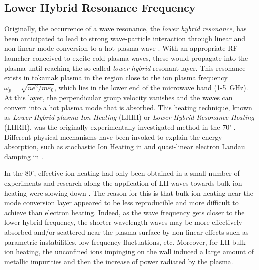 \subsection{Lower Hybrid Resonance Frequency}
Originally, the occurrence of a wave resonance, the \emph{lower hybrid resonance}, has been anticipated to lead to strong wave-particle interaction through linear and non-linear mode conversion to a hot plasma wave . With an appropriate RF launcher conceived to excite cold plasma waves, these would propagate into the plasma until reaching the so-called \textit{lower hybrid} resonant layer. This resonance exists in tokamak plasma in the region close to the ion plasma frequency $\omega_{p}=\sqrt{n e^2/m\varepsilon_0}$, which lies in the lower end of the microwave band (1-5~GHz). At this layer, the perpendicular group velocity vanishes and the waves can convert into a hot plasma mode that is absorbed. This heating technique, known as \emph{Lower Hybrid plasma Ion Heating} (LHIH) or \emph{Lower Hybrid Resonance Heating} (LHRH), was the originally experimentally investigated method in the 70' . Different physical mechanisms have been invoked to explain the energy absorption, such as stochastic Ion Heating in  and quasi-linear electron Landau damping in  .


In the 80', effective ion heating had only been obtained in a small number of experiments and research along the application of LH waves towards bulk ion heating were slowing down . The reason for this is that bulk ion heating near the mode conversion layer appeared to be less reproducible and more difficult to achieve than electron heating. Indeed, as the wave frequency gets closer to the lower hybrid frequency, the shorter wavelength waves may be more effectively absorbed and/or scattered near the plasma surface by non-linear effects such as parametric instabilities, low-frequency fluctuations, etc. Moreover, for LH bulk ion heating, the unconfined ions impinging on the wall induced a large amount of metallic impurities and then the increase of power radiated by the plasma.

